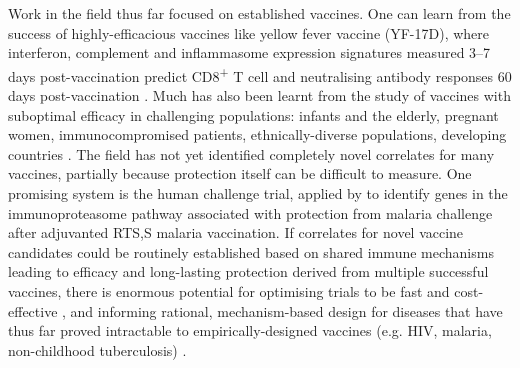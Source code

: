 Work in the field thus far focused on established vaccines.
One can learn from the success of highly-efficacious vaccines like yellow fever vaccine (YF-17D), 
where interferon, complement and inflammasome expression signatures measured \numrange{3}{7} days post-vaccination predict CD8\textsuperscript{+} T cell and neutralising antibody responses 60 days post-vaccination \autocite{pulendran2009LearningImmunologyYellow,li2013SystemsBiologicalApproaches}.
Much has also been learnt from the study of vaccines with suboptimal efficacy in challenging populations: infants and the elderly, pregnant women, immunocompromised patients, ethnically-diverse populations, developing countries \autocite{cotugno2019OMICTechnologiesVaccine}.
The field has not yet identified completely novel correlates for many vaccines, partially because protection itself can be difficult to measure.
One promising system is the human challenge trial, applied by \textcite{vahey2010ExpressionGenesAssociated} to identify genes in the immunoproteasome pathway associated with protection from malaria challenge after adjuvanted RTS,S malaria vaccination.
If correlates for novel vaccine candidates could be routinely established based on shared immune mechanisms leading to efficacy and long-lasting protection derived from multiple successful vaccines,
there is enormous potential for optimising trials to be fast and cost-effective \autocite{pulendran2010SystemsVaccinology,blohmke2015UseSystemsBiology},
and informing rational, mechanism-based design for diseases that have thus far proved intractable to empirically-designed vaccines (e.g. HIV, malaria, non-childhood tuberculosis)
\autocite{degregorio2014EmpiricismRationalDesign,blohmke2015UseSystemsBiology,hagan2015SystemsVaccinologyEnabling,raeven2019SystemsVaccinologyBig}.

